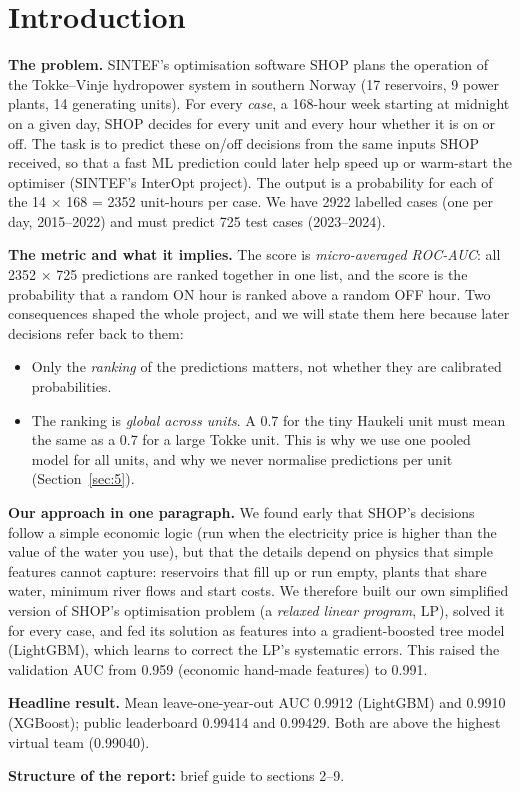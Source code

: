 \section{Introduction}\label{sec:1}

\begin{disposition}
\textbf{The problem.} SINTEF's optimisation software SHOP plans the operation of the Tokke--Vinje hydropower system in southern Norway (17 reservoirs, 9 power plants, 14 generating units). For every \emph{case}, a 168-hour week starting at midnight on a given day, SHOP decides for every unit and every hour whether it is on or off. The task is to predict these on/off decisions from the same inputs SHOP received, so that a fast ML prediction could later help speed up or warm-start the optimiser (SINTEF's InterOpt project). The output is a probability for each of the 14 × 168 = 2352 unit-hours per case. We have 2922 labelled cases (one per day, 2015--2022) and must predict 725 test cases (2023--2024).

\textbf{The metric and what it implies.} The score is \emph{micro-averaged ROC-AUC}: all 2352 × 725 predictions are ranked together in one list, and the score is the probability that a random ON hour is ranked above a random OFF hour. Two consequences shaped the whole project, and we will state them here because later decisions refer back to them:

\begin{itemize}
\tightlist
\item
  Only the \emph{ranking} of the predictions matters, not whether they are calibrated probabilities.
\item
  The ranking is \emph{global across units}. A 0.7 for the tiny Haukeli unit must mean the same as a 0.7 for a large Tokke unit. This is why we use one pooled model for all units, and why we never normalise predictions per unit (Section~\ref{sec:5}).
\end{itemize}

\textbf{Our approach in one paragraph.} We found early that SHOP's decisions follow a simple economic logic (run when the electricity price is higher than the value of the water you use), but that the details depend on physics that simple features cannot capture: reservoirs that fill up or run empty, plants that share water, minimum river flows and start costs. We therefore built our own simplified version of SHOP's optimisation problem (a \emph{relaxed linear program}, LP), solved it for every case, and fed its solution as features into a gradient-boosted tree model (LightGBM), which learns to correct the LP's systematic errors. This raised the validation AUC from 0.959 (economic hand-made features) to 0.991.

\textbf{Headline result.} Mean leave-one-year-out AUC 0.9912 (LightGBM) and 0.9910 (XGBoost); public leaderboard 0.99414 and 0.99429. Both are above the highest virtual team (0.99040).

\textbf{Structure of the report:} brief guide to sections 2--9.
\end{disposition}


